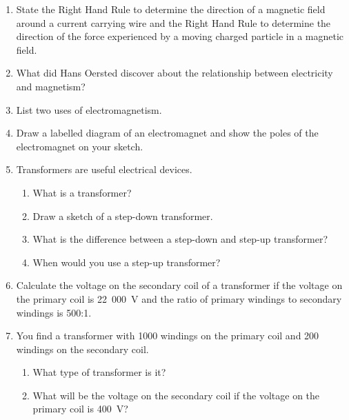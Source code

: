 \begin{eocexercises}{}
\begin {enumerate}
\item State the Right Hand Rule to determine the direction of a magnetic field around a current carrying wire and the Right Hand Rule to determine the direction of the force experienced by a moving charged particle in a magnetic field.
\item What did Hans Oersted discover about the relationship between electricity and magnetism?
\item List two uses of electromagnetism.
\item Draw a labelled diagram of an electromagnet and show the poles of the electromagnet on your sketch.
\item Transformers are useful electrical devices.
\begin{enumerate}
\item What is a transformer?
\item Draw a sketch of a step-down transformer.
\item What is the difference between a step-down and step-up transformer?
\item When would you use a step-up transformer?

\end{enumerate}

\item Calculate the voltage on the secondary coil of a transformer if the voltage on the primary coil is 22~000~V and the ratio of primary windings to secondary windings is 500:1.

\item You find a transformer with 1000 windings on the primary coil and 200 windings on the secondary coil.
\begin{enumerate}
\item What type of transformer is it?
\item What will be the voltage on the secondary coil if the voltage on the primary coil is 400~V?

\end{enumerate}


\end{enumerate}
\end{eocexercises}
